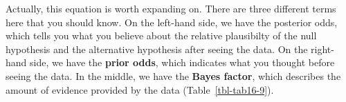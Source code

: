 \documentclass[
  a4paper,
]{book}
\begin{document}
Actually, this equation is worth expanding on. There are three different
terms here that you should know. On the left-hand side, we have the
posterior odds, which tells you what you believe about the relative
plausibilty of the null hypothesis and the alternative hypothesis after
seeing the data. On the right-hand side, we have the \textbf{prior
odds}, which indicates what you thought before seeing the data. In the
middle, we have the \textbf{Bayes factor}, which describes the amount of
evidence provided by the data (Table~\ref{tbl-tab16-9}).

\hypertarget{tbl-tab16-9}{}
 
  \providecommand{\huxb}[2]{\arrayrulecolor[RGB]{#1}\global\arrayrulewidth=#2pt}
  \providecommand{\huxvb}[2]{\color[RGB]{#1}\vrule width #2pt}
  \providecommand{\huxtpad}[1]{\rule{0pt}{#1}}
  \providecommand{\huxbpad}[1]{\rule[-#1]{0pt}{#1}}
\end{document}

